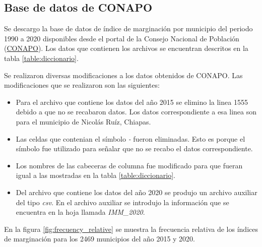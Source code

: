 \subsection{Base de datos de CONAPO}

Se descargo la base de datos de índice de marginación por municipio del periodo 1990 a 2020 disponibles desde el portal de la Consejo Nacional de Población (\href{https://datos.gob.mx/busca/dataset/indice-de-marginacion-carencias-poblacionales-por-localidad-municipio-y-entidad}{CONAPO})\cite{data_2015,data_2020}. Los datos que contienen los archivos se encuentran descritos en la tabla \ref{table:diccionario}.



Se realizaron diversas modificaciones a los datos obtenidos de CONAPO. Las modificaciones que se realizaron son las siguientes:

\begin{itemize}
    \item  Para el archivo que contiene los datos del año 2015 se elimino la linea 1555 debido a que no se recabaron datos. Los datos correspondiente a esa linea son para el municipio de Nicolás Ruíz, Chiapas.
    \item Las celdas que contenian el símbolo \textit{-} fueron eliminadas. Esto es porque el símbolo fue utilizado para señalar que no se recabo el datos correspondiente.
    \item Los nombres de las cabeceras de columna fue modificado para que fueran igual a las mostradas en la tabla \ref*{table:diccionario}.
    \item Del archivo que contiene los datos del año 2020 se produjo un archivo auxiliar del tipo \textit{csv}. En el archivo auxiliar se introdujo la información que se encuentra en la hoja llamada \textit{IMM\_2020}.
\end{itemize}

En la figura \ref{fig:frecuency_relative} se muestra la frecuencia relativa de los índices de marginación para los 2469 municipios del año 2015 y 2020.

